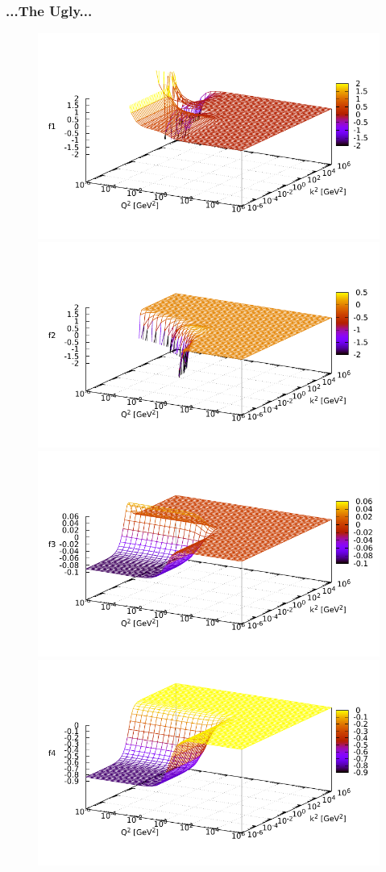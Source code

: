 \begin{frame}
    \frametitle{...The Ugly...}
    \begin{figure}
        \centering
        \includegraphics[width=0.45\linewidth]{graphics/plots_scaled/f1_dse_pv}
        \includegraphics[width=0.45\linewidth]{graphics/plots_scaled/f2_dse_pv}
        \includegraphics[width=0.45\linewidth]{graphics/plots_scaled/f3_dse_pv}
        \includegraphics[width=0.45\linewidth]{graphics/plots_scaled/f4_dse_pv}
        \label{fig:fs}
    \end{figure}
\end{frame}


